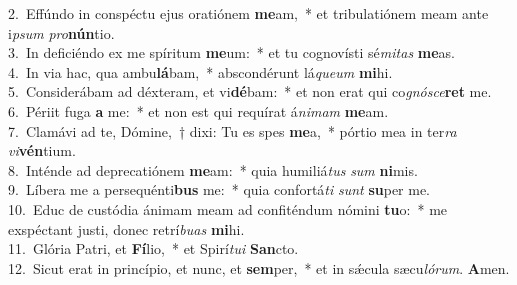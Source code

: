 {2.~}Effúndo in conspéctu ejus oratiónem \textbf{me}am,~* et tribulatiónem meam ante i\textit{psum} \textit{pro}\textbf{nún}tio.\\
{3.~}In deficiéndo ex me spíritum \textbf{me}um:~* et tu cognovísti sé\textit{mi}\textit{tas} \textbf{me}as.\\
{4.~}In via hac, qua ambu\textbf{lá}bam,~* abscondérunt lá\textit{que}\textit{um} \textbf{mi}hi.\\
{5.~}Considerábam ad déxteram, et vi\textbf{dé}bam:~* et non erat qui co\textit{gnó}\textit{sce}\textbf{ret} me.\\
{6.~}Périit fuga \textbf{a} me:~* et non est qui requírat á\textit{ni}\textit{mam} \textbf{me}am.\\
{7.~}Clamávi ad te, Dómine,~† dixi: Tu es spes \textbf{me}a,~* pórtio mea in ter\textit{ra} \textit{vi}\textbf{vén}tium.\\
{8.~}Inténde ad deprecatiónem \textbf{me}am:~* quia humiliá\textit{tus} \textit{sum} \textbf{ni}mis.\\
{9.~}Líbera me a persequénti\textbf{bus} me:~* quia confortá\textit{ti} \textit{sunt} \textbf{su}per me.\\
{10.~}Educ de custódia ánimam meam ad confiténdum nómini \textbf{tu}o:~* me exspéctant justi, donec retrí\textit{bu}\textit{as} \textbf{mi}hi.\\
{11.~}Glória Patri, et \textbf{Fí}lio,~* et Spirí\textit{tu}\textit{i} \textbf{San}cto.\\
{12.~}Sicut erat in princípio, et nunc, et \textbf{sem}per,~* et in sǽcula sæcu\textit{ló}\textit{rum}. \textbf{A}men.\\
